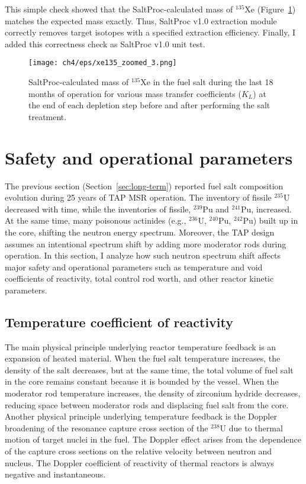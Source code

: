 This simple check showed that the SaltProc-calculated mass of $^{135}$Xe 
(Figure~\ref{fig:xe135-eps-var-zoomes}) matches the expected mass exactly. 
Thus, SaltProc v1.0 extraction module correctly removes target isotopes with a
specified extraction efficiency. Finally, I added this correctness check as  
SaltProc v1.0 unit test.
\begin{figure}[htp!] %
	\centering
	\texttt{[image: ch4/eps/xe135\_zoomed\_3.png]}
	\caption{SaltProc-calculated mass of $^{135}$Xe in the fuel salt during 
	the last 18 months of operation for various mass transfer coefficients 
	($K_L$) at the end of each depletion step before and after performing the 
	salt treatment.}
	\label{fig:xe135-eps-var-zoomes}
\end{figure}
\FloatBarrier


\section{Safety and operational parameters} \label{sec:safety-param}
The previous section (Section~\ref{sec:long-term}) reported fuel salt 
composition evolution during 25 years of \gls{TAP} \gls{MSR} operation.
The inventory of fissile $^{235}$U decreased with time, while the inventories 
of fissile, $^{239}$Pu and $^{241}$Pu, increased. At 
the same time, many poisonous actinides (e.g., $^{236}$U, $^{240}$Pu, 
$^{242}$Pu) built up in the core, shifting the neutron energy 
spectrum. Moreover, the \gls{TAP} design assumes an intentional spectrum shift 
by adding more moderator rods during operation. In this section, I analyze how 
such neutron spectrum shift affects major safety and operational parameters 
such as temperature and void coefficients of reactivity, total control rod 
worth, and other reactor kinetic parameters.

\subsection{Temperature coefficient of reactivity}
The main physical principle underlying reactor temperature feedback is an 
expansion of heated material. When the fuel salt temperature increases, the 
density of the salt decreases, but at the same time, the total volume of fuel 
salt in the core remains constant because it is bounded by the vessel. When 
the moderator rod temperature increases, the density of zirconium hydride 
decreases, reducing space between moderator rods and displacing fuel salt from 
the core. Another physical principle underlying temperature feedback is the 
Doppler broadening of the resonance capture cross section of the $^{238}$U 
due to thermal motion of target nuclei in the fuel. The Doppler effect 
arises from the dependence of the capture cross sections on the relative 
velocity between neutron and nucleus. The Doppler coefficient of reactivity of 
thermal reactors is always negative and instantaneous.

